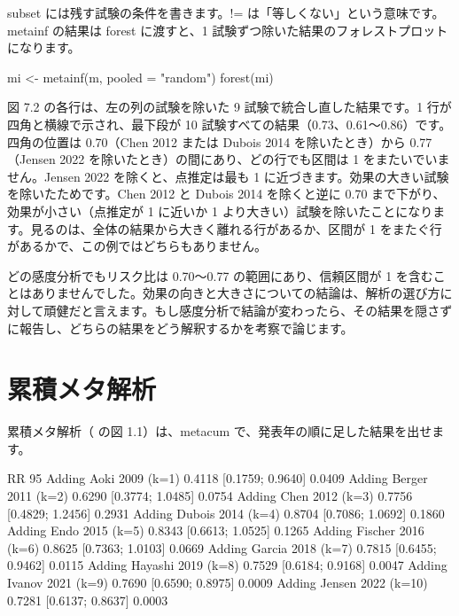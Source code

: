 subset には残す試験の条件を書きます。!= は「等しくない」という意味です。metainf の結果は forest に渡すと、1 試験ずつ除いた結果のフォレストプロットになります。

\begin{rcode}
mi <- metainf(m, pooled = "random")
forest(mi)
\end{rcode}


図 7.2 の各行は、左の列の試験を除いた 9 試験で統合し直した結果です。1 行が四角と横線で示され、最下段が 10 試験すべての結果（0.73、0.61〜0.86）です。四角の位置は 0.70（Chen 2012 または Dubois 2014 を除いたとき）から 0.77（Jensen 2022 を除いたとき）の間にあり、どの行でも区間は 1 をまたいでいません。Jensen 2022 を除くと、点推定は最も 1 に近づきます。効果の大きい試験を除いたためです。Chen 2012 と Dubois 2014 を除くと逆に 0.70 まで下がり、効果が小さい（点推定が 1 に近いか 1 より大きい）試験を除いたことになります。見るのは、全体の結果から大きく離れる行があるか、区間が 1 をまたぐ行があるかで、この例ではどちらもありません。

どの感度分析でもリスク比は 0.70〜0.77 の範囲にあり、信頼区間が 1 を含むことはありませんでした。効果の向きと大きさについての結論は、解析の選び方に対して頑健だと言えます。もし感度分析で結論が変わったら、その結果を隠さずに報告し、どちらの結果をどう解釈するかを考察で論じます。

\section{\hatten 累積メタ解析}
\label{sec:07-7}

累積メタ解析（ の図 1.1）は、metacum で、発表年の順に足した結果を出せます。


\begin{rout}
                           RR            95%
Adding Aoki 2009 (k=1)    0.4118 [0.1759; 0.9640]  0.0409
Adding Berger 2011 (k=2)  0.6290 [0.3774; 1.0485]  0.0754
Adding Chen 2012 (k=3)    0.7756 [0.4829; 1.2456]  0.2931
Adding Dubois 2014 (k=4)  0.8704 [0.7086; 1.0692]  0.1860
Adding Endo 2015 (k=5)    0.8343 [0.6613; 1.0525]  0.1265
Adding Fischer 2016 (k=6) 0.8625 [0.7363; 1.0103]  0.0669
Adding Garcia 2018 (k=7)  0.7815 [0.6455; 0.9462]  0.0115
Adding Hayashi 2019 (k=8) 0.7529 [0.6184; 0.9168]  0.0047
Adding Ivanov 2021 (k=9)  0.7690 [0.6590; 0.8975]  0.0009
Adding Jensen 2022 (k=10) 0.7281 [0.6137; 0.8637]  0.0003
\end{rout}

